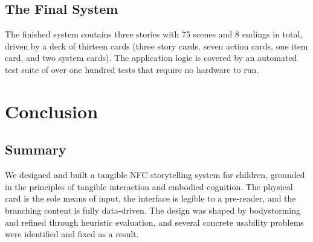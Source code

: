 \subsection{The Final System}


The finished system contains three stories with 75 scenes and 8 endings in
total, driven by a deck of thirteen cards (three story cards, seven action
cards, one item card, and two system cards). The application logic is
covered by an automated test suite of over one hundred tests that require no
hardware to run.

\section{Conclusion}

\subsection{Summary}
We designed and built a tangible NFC storytelling system for children,
grounded in the principles of tangible interaction and embodied cognition.
The physical card is the sole means of input, the interface is legible to a
pre-reader, and the branching content is fully data-driven. The design was
shaped by bodystorming and refined through heuristic evaluation, and several
concrete usability problems were identified and fixed as a result.

